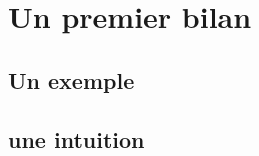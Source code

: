 \section{Un premier bilan}
\label{sec:contribution_tf-ordo_bilan}

\subsection{Un exemple}
\subsection{une intuition}

